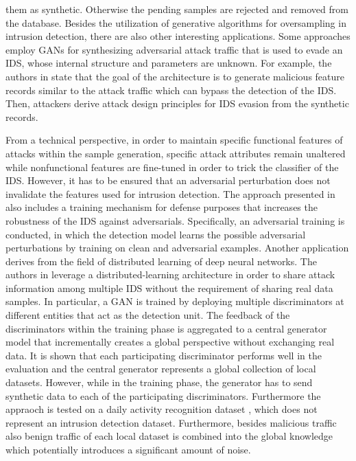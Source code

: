 \documentclass[../../main.tex]{subfiles}
\begin{document}
them as synthetic. Otherwise the pending samples are rejected and removed from the database. Besides the utilization of generative algorithms for oversampling in intrusion detection, there are also other interesting applications. Some approaches employ GANs for synthesizing adversarial attack traffic that is used to evade an IDS, whose internal structure and parameters are unknown. For example, the authors in \cite{lin2022idsgan} state that the goal of the architecture is to generate malicious feature records similar to the attack traffic which can bypass the detection of the IDS. Then, attackers derive attack design principles for IDS evasion from the synthetic records.

From a technical perspective, in order to maintain specific functional features of attacks within the sample generation, specific attack attributes remain unaltered while nonfunctional features are fine-tuned in order to trick the classifier of the IDS. However, it has to be ensured that an adversarial perturbation does not invalidate the features used for intrusion detection. The approach presented in \cite{usama2019generative} also includes a training mechanism for defense purposes that increases the robustness of the IDS against adversarials. Specifically, an adversarial training \cite{szegedy2013intriguing} is conducted, in which the detection model learns the possible adversarial perturbations by training on clean and adversarial examples. Another application derives from the field of distributed learning of deep neural networks. The authors in \cite{ferdowsi2019generative} leverage a distributed-learning architecture in order to share attack information among multiple IDS without the requirement of sharing real data samples. In particular, a GAN is trained by deploying multiple discriminators at different entities that act as the detection unit. The feedback of the discriminators within the training phase is aggregated to a central generator model that incrementally creates a global perspective without exchanging real data. It is shown that each participating discriminator performs well in the evaluation and the central generator represents a global collection of local datasets. However, while in the training phase, the generator has to send synthetic data to each of the participating discriminators. Furthermore the appraoch is tested on a daily activity recognition dataset \cite{reyes2016transition}, which does not represent an intrusion detection dataset. Furthermore, besides malicious traffic also benign traffic of each local dataset is combined into the global knowledge which potentially introduces a significant amount of noise. 
\end{document}
